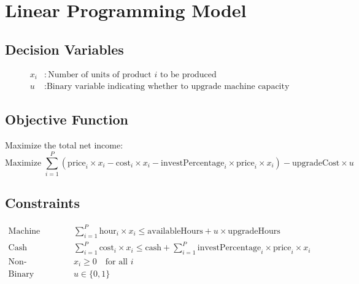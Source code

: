 \documentclass{article}
\begin{document}
\section*{Linear Programming Model}

\subsection*{Decision Variables}
\begin{align*}
x_i & : \text{Number of units of product } i \text{ to be produced} \\
u & : \text{Binary variable indicating whether to upgrade machine capacity}
\end{align*}

\subsection*{Objective Function}
Maximize the total net income:
\begin{equation*}
\text{Maximize } \sum_{i=1}^{P} \left( \text{price}_i \times x_i - \text{cost}_i \times x_i - \text{investPercentage}_i \times \text{price}_i \times x_i \right) - \text{upgradeCost} \times u
\end{equation*}

\subsection*{Constraints}
\begin{align*}
\text{Machine Capacity: } & \sum_{i=1}^{P} \text{hour}_i \times x_i \leq \text{availableHours} + u \times \text{upgradeHours} \\
\text{Cash Constraint: } & \sum_{i=1}^{P} \text{cost}_i \times x_i \leq \text{cash} + \sum_{i=1}^{P} \text{investPercentage}_i \times \text{price}_i \times x_i \\
\text{Non-negativity: } & x_i \geq 0 \quad \text{for all } i \\
\text{Binary Constraint: } & u \in \{0, 1\}
\end{align*}
\end{document}
